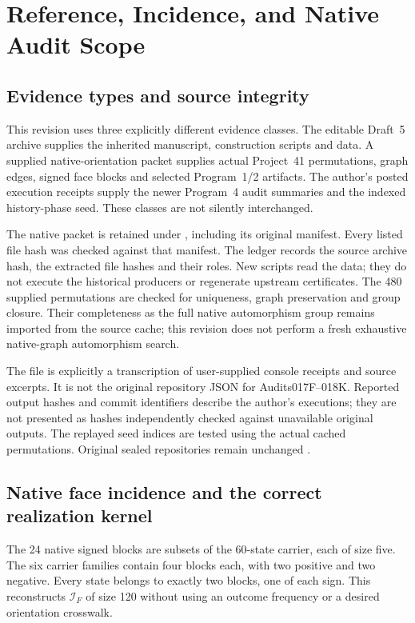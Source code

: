 \section{Reference, Incidence, and Native Audit Scope}\label{app:referenceaudit}
\subsection{Evidence types and source integrity}
This revision uses three explicitly different evidence classes. The editable Draft~5 archive supplies the inherited manuscript, construction scripts and data. A supplied native-orientation packet supplies actual Project~41 permutations, graph edges, signed face blocks and selected Program~1/2 artifacts. The author's posted execution receipts supply the newer Program~4 audit summaries and the indexed history-phase seed. These classes are not silently interchanged.

The native packet is retained under , including its original manifest. Every listed file hash was checked against that manifest. The ledger  records the source archive hash, the extracted file hashes and their roles. New scripts read the data; they do not execute the historical producers or regenerate upstream certificates. The 480 supplied permutations are checked for uniqueness, graph preservation and group closure. Their completeness as the full native automorphism group remains imported from the source cache; this revision does not perform a fresh exhaustive native-graph automorphism search.

The file  is explicitly a transcription of user-supplied console receipts and source excerpts. It is not the original repository JSON for Audits017F--018K. Reported output hashes and commit identifiers describe the author's executions; they are not presented as hashes independently checked against unavailable original outputs. The replayed seed indices are tested using the actual cached permutations. Original sealed repositories remain unchanged \citep{cave2026nativepacket,cave2026p4receipts}.

\subsection{Native face incidence and the correct realization kernel}
The 24 native signed blocks are subsets of the 60-state carrier, each of size five. The six carrier families contain four blocks each, with two positive and two negative. Every state belongs to exactly two blocks, one of each sign. This reconstructs $\mathcal I_F$ of size 120 without using an outcome frequency or a desired orientation crosswalk.

